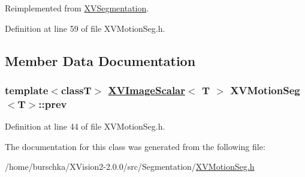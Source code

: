 Reimplemented from \hyperlink{class_XVSegmentation}{XVSegmentation}.

Definition at line 59 of file XVMotion\-Seg.h.

\subsection{Member Data Documentation}
\label{XVMotionSeg_n0}
\hypertarget{class_XVMotionSeg_n0}{
\subsubsection[prev]{\setlength{\rightskip}{0pt plus 5cm}template$<$classT$>$ \hyperlink{class_XVImageScalar}{XVImage\-Scalar}$<$ T $>$ XVMotion\-Seg$<$T$>$::prev}}




Definition at line 44 of file XVMotion\-Seg.h.

The documentation for this class was generated from the following file:\begin{CompactItemize}
\item 
/home/burschka/XVision2-2.0.0/src/Segmentation/\hyperlink{XVMotionSeg.h-source}{XVMotion\-Seg.h}\end{CompactItemize}

